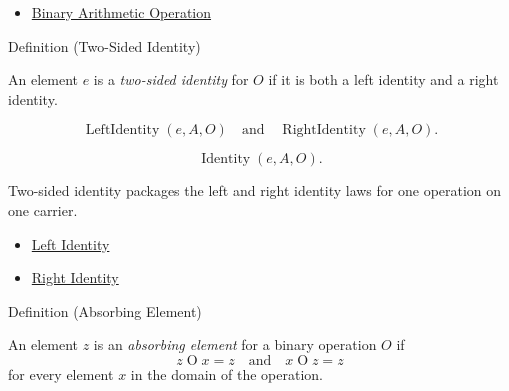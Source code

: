 \begin{dependencies}
\begin{itemize}
  \item \hyperref[def:binary-arithmetic-operation]{Binary Arithmetic Operation}
\end{itemize}
\end{dependencies}

\begin{definitionbox}{Definition (Two-Sided Identity)}
\begin{definition}
\label{def:two-sided-identity}
An element $e$ is a \emph{two-sided identity} for $O$ if it is both a left
identity and a right identity.
\end{definition}
\end{definitionbox}

\begin{remark*}
\[
\operatorname{LeftIdentity}(e,A,O)
\quad\text{and}\quad
\operatorname{RightIdentity}(e,A,O).
\]
\end{remark*}

\begin{remark*}
\[
\operatorname{Identity}(e,A,O).
\]
\end{remark*}

\begin{remark*}[Interpretation]
Two-sided identity packages the left and right identity laws for one operation
on one carrier.
\end{remark*}

\begin{dependencies}
\begin{itemize}
  \item \hyperref[def:left-identity]{Left Identity}
  \item \hyperref[def:right-identity]{Right Identity}
\end{itemize}
\end{dependencies}

\begin{definitionbox}{Definition (Absorbing Element)}
\begin{definition}
\label{def:absorbing-element}
An element $z$ is an \emph{absorbing element} for a binary operation $O$ if
\[
z\mathbin{O}x=z
\quad\text{and}\quad
x\mathbin{O}z=z
\]
for every element $x$ in the domain of the operation.
\end{definition}
\end{definitionbox}

